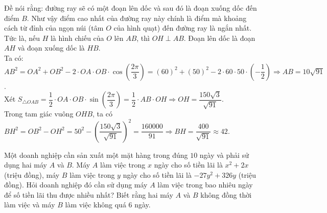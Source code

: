 \begin{bt}
{\begin{center}
\begin{tikzpicture}[scale=0.05,font=\footnotesize,line join=round,line cap=round,>=stealth]
		\end{tikzpicture}
		\end{center}
		Đề nói rằng: đường ray sẽ có một đoạn lên dốc và sau đó là đoạn xuống dốc đến điểm $B$. Như vậy  điểm cao nhất của đường ray này chính là điểm mà khoảng cách từ đỉnh của ngọn núi (tâm $O$ của hình quạt) đến đường ray là ngắn nhất. Tức là, nếu $H$ là hình chiếu của $O$ lên $AB$, thì $OH \perp AB$. Đoạn lên dốc là đoạn $AH$ và đoạn xuống dốc là $HB$.\\
		Ta có:  $AB^2=OA^2+OB^2-2 \cdot OA \cdot OB \cdot \cos\left(\dfrac{2\pi}{3}\right) = (60)^2+(50)^2-2 \cdot 60 \cdot 50 \cdot \left(-\dfrac{1}{2}\right)\Rightarrow AB=10\sqrt{91}$.\\
		Xét $S_{\triangle OAB}=\dfrac{1}{2}\cdot OA\cdot OB\cdot \sin\left(\dfrac{2\pi}{3}\right)=\dfrac{1}{2}\cdot AB\cdot  OH\Rightarrow OH=\dfrac{150\sqrt{3}}{\sqrt{91}}$.\\
		Trong tam giác vuông $OHB$, ta  có $BH^2=OB^2-OH^2 = 50^2 - \left(\dfrac{150\sqrt{3}}{\sqrt{91}}\right)^2 =\dfrac{160000}{91}\Rightarrow BH= \dfrac{400}{\sqrt{91}}\approx 42$.
	} 
\end{bt}

\begin{bt}%
	Một doanh nghiệp cần sản xuất một mặt hàng trong đúng $10$ ngày và phải sử dụng hai máy $A$ và $B$. Máy $A$ làm việc trong $x$ ngày cho số tiền lãi là ${{x}^{2}}+2x$ (triệu đồng), máy $B$ làm việc trong $y$ ngày cho số  tiền lãi là $-27{{y}^{2}}+326y$ (triệu đồng). Hỏi doanh nghiệp đó cần sử dụng máy $A$ làm việc trong bao nhiêu ngày để số tiền lãi thu được nhiều nhất? Biết rằng hai máy $A$ và $B$ không đồng thời làm việc và máy $B$ làm việc không quá $6$ ngày.
\end{bt}


